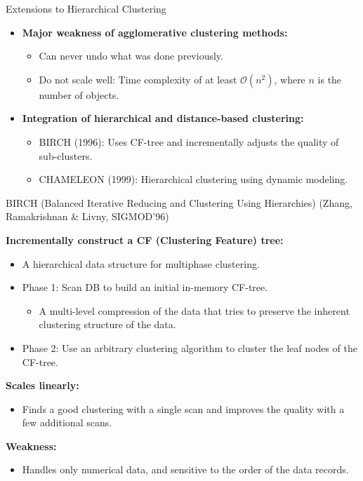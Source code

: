 \begin{frame}{Extensions to Hierarchical Clustering}
	\begin{itemize}
		\item \textbf{Major weakness of agglomerative clustering methods:}
		      \begin{itemize}
			      \item Can never undo what was done previously.
			      \item Do not scale well: Time complexity of at least
			            $\mathcal{O}(n^2)$, where $n$ is the number of objects.
		      \end{itemize}
		\item \textbf{Integration of hierarchical and distance-based
			      clustering:}
		      \begin{itemize}
			      \item BIRCH (1996): Uses CF-tree and incrementally adjusts the
			            quality of sub-clusters.
			      \item CHAMELEON (1999): Hierarchical clustering using dynamic
			            modeling.
		      \end{itemize}
	\end{itemize}
\end{frame}

\begin{frame}{BIRCH (Balanced Iterative Reducing and Clustering Using
		Hierarchies)}
	(Zhang, Ramakrishnan \& Livny, SIGMOD'96)

	\textbf{Incrementally construct a CF (Clustering Feature) tree:}
	\begin{itemize}
		\item A hierarchical data structure for multiphase clustering.
		\item Phase 1: Scan DB to build an initial in-memory CF-tree.
		      \begin{itemize}
			      \item A multi-level compression of the data that tries to
			            preserve the inherent clustering structure of the data.
		      \end{itemize}
		\item Phase 2: Use an arbitrary clustering algorithm to cluster the
		      leaf nodes of the CF-tree.
	\end{itemize}
	\textbf{Scales linearly:}
	\begin{itemize}
		\item Finds a good clustering with a single scan and improves the
		      quality with a few additional scans.
	\end{itemize}
	\textbf{Weakness:}
	\begin{itemize}
		\item Handles only numerical data, and sensitive to the order of
		      the data records.
	\end{itemize}
\end{frame}

